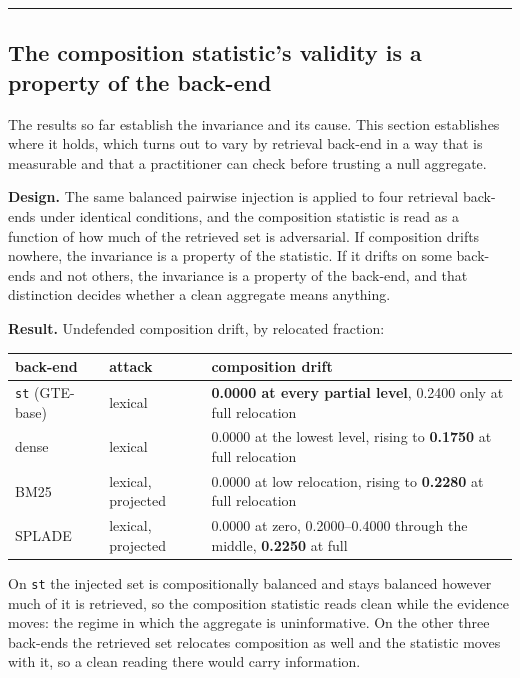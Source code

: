 \documentclass[authoryear,review,3p,times]{elsarticle}
\begin{document}
\begin{center}\rule{0.5\linewidth}{0.5pt}\end{center}

\subsection{The composition statistic's validity is a property of the back-end}\label{the-composition-statistics-validity-is-a-property-of-the-back-end}

The results so far establish the invariance and its cause. This section establishes where it holds, which turns out to vary by retrieval back-end in a way that is measurable and that a practitioner can check before trusting a null aggregate.

\textbf{Design.} The same balanced pairwise injection is applied to four retrieval back-ends under identical conditions, and the composition statistic is read as a function of how much of the retrieved set is adversarial. If composition drifts nowhere, the invariance is a property of the statistic. If it drifts on some back-ends and not others, the invariance is a property of the back-end, and that distinction decides whether a clean aggregate means anything.

\textbf{Result.} Undefended composition drift, by relocated fraction:

\begin{center}
\begin{tabular}{lll}
\hline
back-end & attack & composition drift \\
\hline
\texttt{st} (GTE-base) & lexical & \textbf{0.0000 at every partial level}, 0.2400 only at full relocation \\
dense & lexical & 0.0000 at the lowest level, rising to \textbf{0.1750} at full relocation \\
BM25 & lexical, projected & 0.0000 at low relocation, rising to \textbf{0.2280} at full relocation \\
SPLADE & lexical, projected & 0.0000 at zero, 0.2000--0.4000 through the middle, \textbf{0.2250} at full \\
\hline
\end{tabular}
\end{center}

On \texttt{st} the injected set is compositionally balanced and stays balanced however much of it is retrieved, so the composition statistic reads clean while the evidence moves: the regime in which the aggregate is uninformative. On the other three back-ends the retrieved set relocates composition as well and the statistic moves with it, so a clean reading there would carry information.
\end{document}
